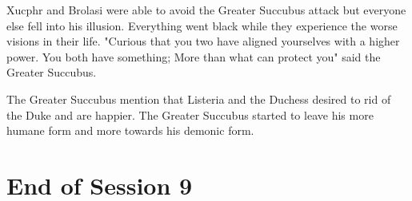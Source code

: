 Xucphr and Brolasi were able to avoid the Greater Succubus attack but everyone else fell into his illusion. Everything went black while they experience the worse visions in their life. "Curious that you two have aligned yourselves with a higher power. You both have something; More than what can protect you" said the Greater Succubus. 

The Greater Succubus mention that Listeria and the Duchess desired to rid of the Duke and are happier. The Greater Succubus started to leave his more humane form and more towards his demonic form.


\section{End of Session 9}
